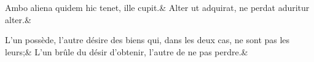 \documentclass[a4paper, 11pt]{book}
\begin{document}
    \begin{pairs}
%
\begin{Leftside}%
\setcounter{stanzaindentsrepetition}{2}
\beginnumbering\stanza
Ambo aliena quidem hic tenet, ille cupit.&
Alter ut adquirat, ne perdat aduritur alter.\&
\endnumbering\end{Leftside}%


\begin{Rightside}
\setcounter{stanzaindentsrepetition}{2}%
\beginnumbering\stanza%
L’un possède, l’autre désire des biens qui, dans les deux cas, ne sont pas les leurs;&
 L’un brûle du désir d’obtenir, l’autre de ne pas  perdre.\&
 \endnumbering
\end{Rightside}
\end{pairs}
\Columns
    
\end{document}
